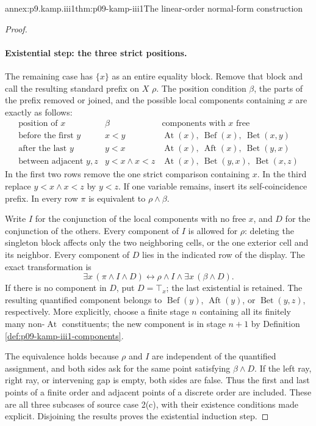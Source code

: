 \begin{annexitem}{annex:p9.kamp.iii1}{thm:p09-kamp-iii1}{The linear-order normal-form construction}
\begin{proof}
\paragraph{Existential step: the three strict positions.}
The remaining case has \(\{x\}\) as an entire equality block.  Remove
that block and call the resulting standard prefix on \(X\) \(\rho\).
The position condition \(\beta\), the parts of the prefix removed or
joined, and the possible local components containing \(x\) are exactly
as follows:
\[
\begin{array}{c|c|l}
 \text{position of }x&\beta&\text{components with }x\text{ free}\\ \hline
 \text{before the first }y&x<y&
 \operatorname{At}(x),\ \operatorname{Bef}(x),\ \operatorname{Bet}(x,y)\\
 \text{after the last }y&y<x&
 \operatorname{At}(x),\ \operatorname{Aft}(x),\ \operatorname{Bet}(y,x)\\
 \text{between adjacent }y,z&y<x\land x<z&
 \operatorname{At}(x),\ \operatorname{Bet}(y,x),\ \operatorname{Bet}(x,z)
\end{array}
\]
In the first two rows remove the one strict comparison containing \(x\).
In the third replace \(y<x\land x<z\) by \(y<z\).
If one variable remains, insert its self-coincidence prefix.  In every row
\(\pi\) is equivalent to \(\rho\land\beta\).

Write \(I\) for the conjunction of the local components with no free
\(x\), and \(D\) for the conjunction of the others.  Every component of
\(I\) is allowed for \(\rho\): deleting the singleton block affects
only the two neighboring cells, or the one exterior cell and its neighbor.
Every component of \(D\) lies in the indicated row of the display.
The exact transformation is
\[
 \exists x\,(\pi\land I\land D)
 \longleftrightarrow
 \rho\land I\land\exists x\,(\beta\land D).
\]
If there is no component in \(D\), put \(D=\top_x\); the last
existential is retained.  The resulting quantified component belongs to
\(\operatorname{Bef}(y)\), \(\operatorname{Aft}(y)\), or
\(\operatorname{Bet}(y,z)\), respectively.  More explicitly, choose a
finite stage \(n\) containing all its finitely many non-\(\operatorname{At}\)
constituents; the new component is in stage \(n+1\) by Definition~
\ref{def:p09-kamp-iii1-components}.

The equivalence holds because \(\rho\) and \(I\) are independent of
the quantified assignment, and both sides ask for the same point satisfying
\(\beta\land D\).  If the left ray, right ray, or intervening gap is
empty, both sides are false.  Thus the first and last points of a finite
order and adjacent points of a discrete order are included.  These are all
three subcases of source case 2(c), with their existence conditions made
explicit.  Disjoining the results proves the existential induction step.


\end{proof}
\end{annexitem}
